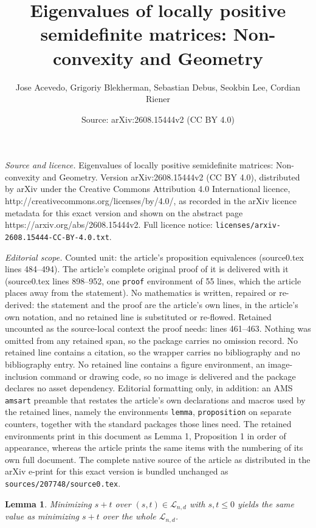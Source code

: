 \documentclass[10pt,a4paper]{amsart}
\title{Eigenvalues of locally positive semidefinite matrices: Non-convexity and Geometry}
\author{Jose Acevedo, Grigoriy Blekherman, Sebastian Debus, Seokbin Lee, Cordian Riener}
\date{Source: arXiv:2608.15444v2 (CC BY 4.0)}
\newtheorem{lemma}{Lemma}
\begin{document}
\maketitle

\noindent\emph{Source and licence.} Eigenvalues of locally positive semidefinite matrices: Non-convexity and Geometry. Version arXiv:2608.15444v2 (CC BY 4.0), distributed by arXiv under the Creative Commons Attribution 4.0 International licence, http://creativecommons.org/licenses/by/4.0/, as recorded in the arXiv licence metadata for this exact version and shown on the abstract page https://arxiv.org/abs/2608.15444v2. Full licence notice: \texttt{licenses/arxiv-2608.15444-CC-BY-4.0.txt}.\par\smallskip

\noindent\textit{Editorial scope.} Counted unit: the article's proposition equivalences (source0.tex lines 484--494). The article's complete original proof of it is delivered with it (source0.tex lines 898--952, one \texttt{proof} environment of 55 lines, which the article places away from the statement). No mathematics is written, repaired or re-derived: the statement and the proof are the article's own lines, in the article's own notation, and no retained line is substituted or re-flowed.  Retained uncounted as the source-local context the proof needs: lines 461--463.  Nothing was omitted from any retained span, so the package carries no omission record.  No retained line contains a citation, so the wrapper carries no bibliography and no bibliography entry.  No retained line contains a figure environment, an image-inclusion command or drawing code, so no image is delivered and the package declares no asset dependency.  Editorial formatting only, in addition: an AMS \texttt{amsart} preamble that restates the article's own declarations and macros used by the retained lines, namely the environments \texttt{lemma}, \texttt{proposition} on separate counters, together with the standard packages those lines need.  The retained environments print in this document as Lemma 1, Proposition 1 in order of appearance, whereas the article prints the same items with the numbering of its own full document.  The complete native source of the article as distributed in the arXiv e-print for this exact version is bundled unchanged as \texttt{sources/207748/source0.tex}.
\begin{lemma}\label{lem: s,t <= 0}
Minimizing $s+t$ over $(s,t) \in \mathcal{L}_{n,d}$ with $s,t\leq 0$ yields the same value as minimizing $s+t$ over the whole $\mathcal{L}_{n,d}$. 
\end{lemma}
\end{document}
